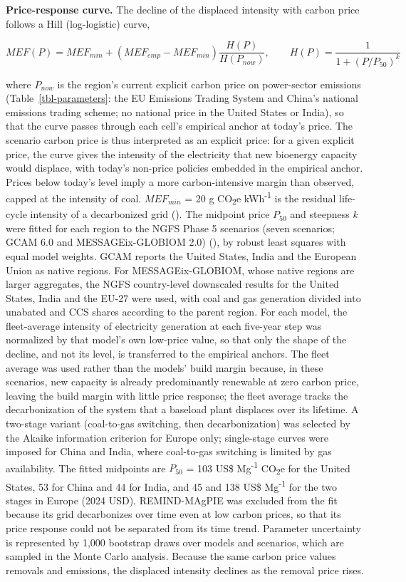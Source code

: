 \documentclass[
  letterpaper,
]{article}
\begin{document}
\textbf{Price-response curve.} The decline of the displaced intensity
with carbon price follows a Hill (log-logistic) curve,

\[MEF(P) = MEF_{min} + \left(MEF_{emp} - MEF_{min}\right) \frac{H(P)}{H(P_{now})}, \qquad H(P) = \frac{1}{1 + (P/P_{50})^{k}}\]

where \(P_{now}\) is the region's current explicit carbon price on
power-sector emissions (Table~\ref{tbl-parameters}: the EU Emissions
Trading System and China's national emissions trading scheme; no
national price in the United States or India), so that the curve passes
through each cell's empirical anchor at today's price. The scenario
carbon price is thus interpreted as an explicit price: for a given
explicit price, the curve gives the intensity of the electricity that
new bioenergy capacity would displace, with today's non-price policies
embedded in the empirical anchor. Prices below today's level imply a
more carbon-intensive margin than observed, capped at the intensity of
coal. \(MEF_{min}\) = 20 g CO\textsubscript{2}e kWh\textsuperscript{-1}
is the residual life-cycle intensity of a decarbonized grid
(). The midpoint price \(P_{50}\) and
steepness \(k\) were fitted for each region to the NGFS Phase 5
scenarios (seven scenarios; GCAM 6.0 and MESSAGEix-GLOBIOM 2.0)
(), by robust least squares with
equal model weights. GCAM reports the United States, India and the
European Union as native regions. For MESSAGEix-GLOBIOM, whose native
regions are larger aggregates, the NGFS country-level downscaled results
for the United States, India and the EU-27 were used, with coal and gas
generation divided into unabated and CCS shares according to the parent
region. For each model, the fleet-average intensity of electricity
generation at each five-year step was normalized by that model's own
low-price value, so that only the shape of the decline, and not its
level, is transferred to the empirical anchors. The fleet average was
used rather than the models' build margin because, in these scenarios,
new capacity is already predominantly renewable at zero carbon price,
leaving the build margin with little price response; the fleet average
tracks the decarbonization of the system that a baseload plant displaces
over its lifetime. A two-stage variant (coal-to-gas switching, then
decarbonization) was selected by the Akaike information criterion for
Europe only; single-stage curves were imposed for China and India, where
coal-to-gas switching is limited by gas availability. The fitted
midpoints are \(P_{50}\) = 103 US\$ Mg\textsuperscript{-1}
CO\textsubscript{2}e for the United States, 53 for China and 44 for
India, and 45 and 138 US\$ Mg\textsuperscript{-1} for the two stages in
Europe (2024 USD). REMIND-MAgPIE was excluded from the fit because its
grid decarbonizes over time even at low carbon prices, so that its price
response could not be separated from its time trend. Parameter
uncertainty is represented by 1,000 bootstrap draws over models and
scenarios, which are sampled in the Monte Carlo analysis. Because the
same carbon price values removals and emissions, the displaced intensity
declines as the removal price rises.
\end{document}
